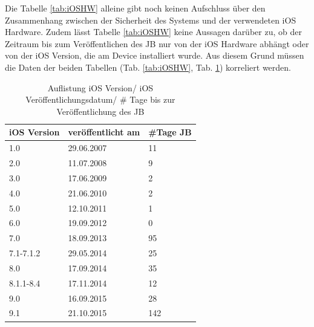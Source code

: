Die Tabelle \ref{tab:iOSHW} alleine gibt noch keinen Aufschluss über den Zusammenhang zwischen der Sicherheit des Systems und der verwendeten iOS Hardware. Zudem lässt Tabelle \ref{tab:iOSHW} keine Aussagen darüber zu, ob der Zeitraum bis zum Veröffentlichen des JB nur von der iOS Hardware abhängt oder von der iOS Version, die am Device installiert wurde. Aus diesem Grund müssen die Daten der beiden Tabellen (Tab. \ref{tab:iOSHW}, Tab. \ref{tab:iOSVersion}) korreliert werden. \par 
\begin{table}[htp!]
    \begin{center}
        \begin{tabular}{|l|l|l|} \hline
         \textbf{iOS Version} & \textbf{veröffentlicht am} & \textbf{\#Tage JB}\\ \hline    
        1.0 & 29.06.2007 & 11\\ \hline 
        2.0 & 11.07.2008	& 9\\ \hline 
        3.0 & 17.06.2009	& 2\\ \hline 
        4.0 & 21.06.2010 & 2\\ \hline 
        5.0 & 12.10.2011	& 1\\ \hline 
        6.0 & 19.09.2012	& 0\\ \hline 
        7.0 & 18.09.2013	& 95\\ \hline 
        7.1-7.1.2 & 29.05.2014 & 25\\ \hline 
        8.0 & 17.09.2014	& 35\\ \hline 
        8.1.1-8.4 & 17.11.2014	& 12\\ \hline 
        9.0 & 16.09.2015	& 28\\ \hline
        9.1 & 21.10.2015	& 142\\ \hline 
        \end{tabular} 
        \caption{Auflistung iOS Version/ iOS Veröffentlichungsdatum/ \# Tage bis zur Veröffentlichung des JB \protect\footnotemark}
        \label{tab:iOSVersion}
    \end{center}
\end{table}

